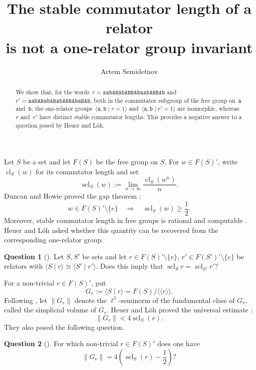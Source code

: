 \documentclass[12pt,a4paper,oneside]{amsart}
\title[Stable commutator length of a relator]{The stable commutator length of a relator\\ is not a one-relator group invariant}
\author{Artem Semidetnov}
\date{}
\DeclareMathOperator{\scl}{scl}
\newcommand{\nc}[1]{\langle\!\langle #1 \rangle\!\rangle}
\newcommand{\genrel}[2]{\langle #1 \mid #2 \rangle}
\theoremstyle{plain}
\theoremstyle{definition}
\newtheorem*{Question}{Question}
\begin{document}
\vspace*{-15mm}

\begin{abstract}
We show that, for the words~\mbox{{\scriptsize \(r=\mathtt{aabABabABBAbaabABBAb}\)}} and~\mbox{{\scriptsize \(r'=\mathtt{aabABabABabABBAbaBAb}\)}}, both in the commutator subgroup of the free group on~\(\mathtt{a}\) and~\(\mathtt{b}\), the one-relator groups~\mbox{\(\langle \mathtt{a,b}\mid r=1\rangle\)} and~\mbox{\(\langle \mathtt{a,b}\mid r'=1\rangle\)} are isomorphic, whereas~\(r\) and~\(r'\) have distinct stable commutator lengths. This provides a negative answer to a question posed by Heuer and L\"oh.
\end{abstract}

\maketitle

Let \(S\) be a set and let \(F(S)\) be the free group on \(S\). For \(w\in F(S)'\), write \(\operatorname{cl}_S(w)\) for its commutator length and set
\[
  \scl_S(w):=\lim_{n\to\infty}\frac{\operatorname{cl}_S(w^n)}{n}.
\]
Duncan and Howie proved the gap theorem \cite[Theorem~3.3]{DuncanHowie1991}:
\[
  w\in F(S)'\setminus\{e\}\quad\Longrightarrow\quad \scl_S(w)\geq \frac12.
\]
Moreover, stable commutator length in free groups is rational and computable \cite{Calegari2009}. Heuer and L\"oh asked whether this quantity can be recovered from the corresponding one-relator group.

\begin{Question}[{\normalfont \cite[Question~1.3(1)]{HeuerLoeh2022}}]
Let \(S,S'\) be sets and let \(r\in F(S)'\setminus\{e\}\), \(r'\in F(S')'\setminus\{e\}\) be relators with \(\genrel{S}{r}\cong\genrel{S'}{r'}\). Does this imply that \(\scl_S r=\scl_{S'}r'\)?
\end{Question}

For a non-trivial \(r\in F(S)'\), put
\[
  G_r:=\genrel{S}{r}=F(S)/\nc r.
\]
Following \cite{HeuerLoeh2022}, let \(\lVert G_r\rVert\) denote the \(\ell^1\)-seminorm of the fundamental class of \(G_r\), called the simplicial volume of \(G_r\). Heuer and L\"oh proved the universal estimate \cite[Corollary~3.12]{HeuerLoeh2022}:
\[
  \lVert G_r\rVert<4\scl_S(r).
\]
They also posed the following question.

\begin{Question}[{\normalfont \cite[Question~1.2]{HeuerLoeh2022}}]
For which non-trivial \(r\in F(S)'\) does one have
\[
  \lVert G_r\rVert=4\left(\scl_S(r)-\frac12\right)?
\]
\end{Question}
\end{document}
